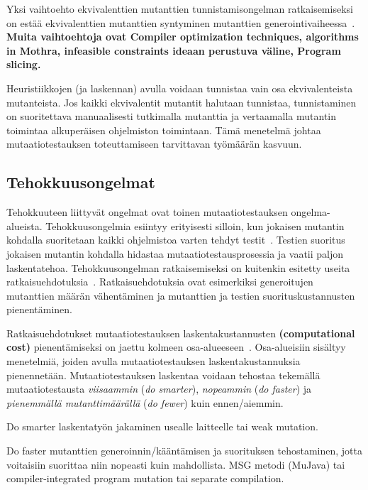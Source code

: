 \documentclass[finnish, grading]{tktltiki2}
\theoremstyle{definition}
\theoremstyle{remark}
\begin{document}
Yksi vaihtoehto ekvivalenttien mutanttien tunnistamisongelman ratkaisemiseksi on estää ekvivalenttien mutanttien syntyminen mutanttien generointivaiheessa~\cite[s. 80]{Offutt:Ma:Kwon:2006:MuClassLevel}. \textbf{Muita vaihtoehtoja ovat Compiler optimization techniques, algorithms in Mothra, infeasible constraints ideaan perustuva väline, Program slicing.}

Heuristiikkojen (ja laskennan) avulla voidaan tunnistaa vain osa ekvivalenteista mutanteista. Jos kaikki ekvivalentit mutantit halutaan tunnistaa, tunnistaminen on suoritettava manuaalisesti tutkimalla mutanttia ja vertaamalla mutantin toimintaa alkuperäisen ohjelmiston toimintaan. Tämä menetelmä johtaa mutaatiotestauksen toteuttamiseen tarvittavan työmäärän kasvuun.

\subsection{Tehokkuusongelmat}

Tehokkuuteen liittyvät ongelmat ovat toinen mutaatiotestauksen ongelma-alueista. Tehokkuusongelmia esiintyy erityisesti silloin, kun jokaisen mutantin kohdalla suoritetaan kaikki ohjelmistoa varten tehdyt testit~\cite[s. 652]{Jia:Harman:2011}. Testien suoritus jokaisen mutantin kohdalla hidastaa mutaatiotestausprosessia ja vaatii paljon laskentatehoa. Tehokkuusongelman ratkaisemiseksi on kuitenkin esitetty useita ratkaisuehdotuksia~\cite[s. 653]{Jia:Harman:2011}. Ratkaisuehdotuksia ovat esimerkiksi generoitujen mutanttien määrän vähentäminen ja mutanttien ja testien suorituskustannusten pienentäminen.

Ratkaisuehdotukset mutaatiotestauksen laskentakustannusten \textbf{(computational cost)} pienentämiseksi on jaettu kolmeen osa-alueeseen~\cite[s. 37]{Offutt:Untch:2001}. Osa-alueisiin sisältyy menetelmiä, joiden avulla mutaatiotestauksen laskentakustannuksia pienennetään. Mutaatiotestauksen laskentaa voidaan tehostaa tekemällä mutaatiotestausta \textit{viisaammin} (\textit{do smarter}), \textit{nopeammin} (\textit{do faster}) ja \textit{pienemmällä mutanttimäärällä} (\textit{do fewer}) kuin ennen/aiemmin.

Do smarter laskentatyön jakaminen usealle laitteelle tai weak mutation. 

Do faster mutanttien generoinnin/kääntämisen ja suorituksen tehostaminen, jotta voitaisiin suorittaa niin nopeasti kuin mahdollista. MSG metodi (MuJava) tai compiler-integrated program mutation tai separate compilation.
\end{document}
